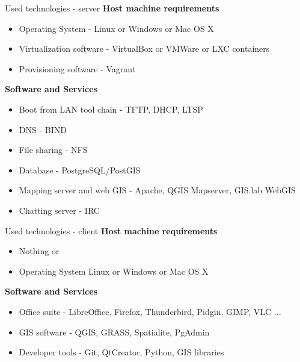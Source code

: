 \documentclass[12pt]{beamer}
\begin{document}
\begin{frame}{Used technologies - server}
	\textbf{Host machine requirements}
	\begin{itemize}
		\item Operating System - Linux or Windows or Mac OS X
		\item Virtualization software - VirtualBox or VMWare or LXC containers
		\item Provisioning software - Vagrant
	\end{itemize}

	\textbf{Software and Services}
	\begin{itemize}
		\item Boot from LAN tool chain - TFTP, DHCP, LTSP
		\item DNS - BIND
		\item File sharing - NFS
		\item Database - PostgreSQL/PostGIS
		\item Mapping server and web GIS - Apache, QGIS Mapserver, GIS.lab WebGIS
		\item Chatting server - IRC
	\end{itemize}	
\end{frame}


\begin{frame}{Used technologies - client}
	\textbf{Host machine requirements}
	\begin{itemize}
		\item Nothing or
		\item Operating System Linux or Windows or Mac OS X
	\end{itemize}

	\textbf{Software and Services}
	\begin{itemize}
		\item Office suite - LibreOffice, Firefox, Thunderbird, Pidgin, GIMP, VLC ...
		\item GIS software - QGIS, GRASS, Spatialite, PgAdmin
		\item Developer tools - Git, QtCreator, Python, GIS libraries
	\end{itemize}	
\end{frame}


\end{document}
